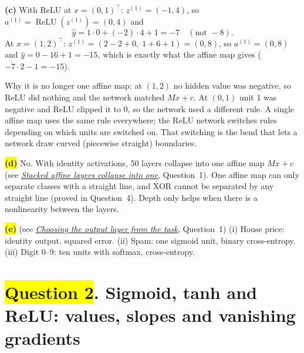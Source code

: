 \documentclass[12pt,a4paper]{article}
\newcommand{\seeconcept}[3]{(see \hyperref[#1]{\textit{#2}}, Question~#3)}
\newcommand{\relu}{\operatorname{ReLU}}
\newcommand{\hlq}[1]{{\setlength{\fboxsep}{1.5pt}\colorbox{yellow}{#1}}}
\begin{document}
\textbf{(c)} With ReLU at $x=(0,1)^\top$: $z^{(1)}=(-1,4)$, so $a^{(1)}=\relu(z^{(1)})=(0,4)$ and
\[
\hat y = 1\cdot0 + (-2)\cdot4 + 1 = -7 \quad(\text{not } -8).
\]
At $x=(1,2)^\top$: $z^{(1)} = (2-2+0,\;1+6+1) = (0,8)$, so $a^{(1)}=(0,8)$ and $\hat y = 0-16+1=-15$, which is exactly what the affine map gives ($-7\cdot2-1=-15$).

Why it is no longer one affine map: at $(1,2)$ no hidden value was negative, so ReLU did nothing and the network matched $Mx+c$. At $(0,1)$ unit 1 was negative and ReLU clipped it to 0, so the network used a different rule. A single affine map uses the same rule everywhere; the ReLU network switches rules depending on which units are switched on. That switching is the bend that lets a network draw curved (piecewise straight) boundaries.

\hlq{\textbf{(d)}} No. With identity activations, 50 layers collapse into one affine map $Mx+c$ \seeconcept{c:collapse}{Stacked affine layers collapse into one}{1}. One affine map can only separate classes with a straight line, and XOR cannot be separated by any straight line (proved in Question~4). Depth only helps when there is a nonlinearity between the layers.

\hlq{\textbf{(e)}} \seeconcept{c:outputs}{Choosing the output layer from the task}{1}
(i) House price: identity output, squared error. (ii) Spam: one sigmoid unit, binary cross-entropy. (iii) Digit 0--9: ten units with softmax, cross-entropy.

\section[Question 2. Sigmoid, tanh and ReLU: values, slopes and vanishing gradients]{\hlq{Question 2}. Sigmoid, tanh and ReLU: values, slopes and vanishing gradients}
\end{document}
